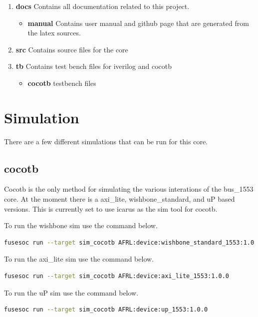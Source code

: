 \begin{enumerate}
  \item \textbf{docs} Contains all documentation related to this project.
    \begin{itemize}
      \item \textbf{manual} Contains user manual and github page that are generated from the latex sources.
    \end{itemize}
  \item \textbf{src} Contains source files for the core
  \item \textbf{tb} Contains test bench files for iverilog and cocotb
    \begin{itemize}
      \item \textbf{cocotb} testbench files
    \end{itemize}
\end{enumerate}

\newpage

\section{Simulation}
\par
There are a few different simulations that can be run for this core.

\subsection{cocotb}
\par
Cocotb is the only method for simulating the various interations of the bus\_1553 core. At the moment there is a
axi\_lite, wishbone\_standard, and uP based versions. This is currently set to use icarus as the sim tool for cocotb.

\par
To run the wishbone sim use the command below.
\begin{lstlisting}[language=bash]
fusesoc run --target sim_cocotb AFRL:device:wishbone_standard_1553:1.0.0
\end{lstlisting}

\par
To run the axi\_lite sim use the command below.
\begin{lstlisting}[language=bash]
fusesoc run --target sim_cocotb AFRL:device:axi_lite_1553:1.0.0
\end{lstlisting}

\par
To run the uP sim use the command below.
\begin{lstlisting}[language=bash]
fusesoc run --target sim_cocotb AFRL:device:up_1553:1.0.0
\end{lstlisting}


